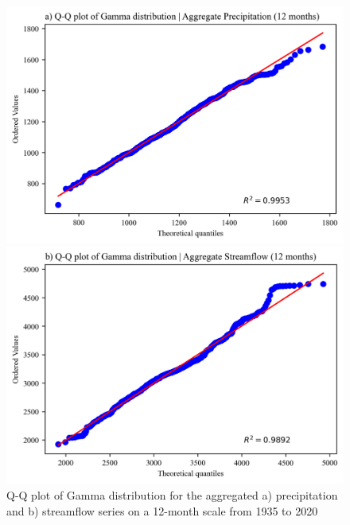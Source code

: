         \begin{figure}
            \centering
                \begin{minipage}[t]{0.49\linewidth}
                    \includegraphics[width = \linewidth]{
                    figs/Q-Q_Plot_Gamma_Pr-12.png}
                \end{minipage}
                \hfill    
                \begin{minipage}[t]{0.49\linewidth}
                    \includegraphics[width = \linewidth]{
                    figs/Q-Q_Plot_Gamma_Q-12.png}
                \end{minipage}            
            \caption{
                Q-Q plot of Gamma distribution for the aggregated a) precipitation and b) streamflow series on a 12-month scale from 1935 to 2020
            }
            \label{fig:probplot}
        \end{figure}
        
